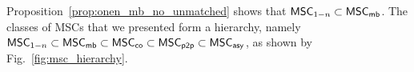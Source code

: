 \documentclass{article}
\begin{document}

Proposition~\ref{prop:onen_mb_no_unmatched} shows that $\mathsf{MSC}_{1\mathsf{-}n} \subset \mathsf{MSC}_{\mathsf{mb}}$. The classes of MSCs that we presented form a hierarchy, namely $\mathsf{MSC}_{1\mathsf{-}n} \subset \mathsf{MSC}_{\mathsf{mb}} \subset \mathsf{MSC}_{\mathsf{co}} \subset \mathsf{MSC}_{\mathsf{p2p}} \subset \mathsf{MSC}_{\mathsf{asy}}$, as shown by Fig.~\ref{fig:msc_hierarchy}.
\end{document}
